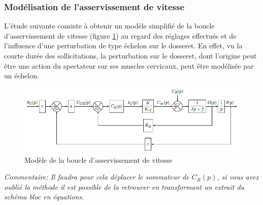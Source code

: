 \subsubsection{Modélisation de l'asservissement de vitesse}

L'étude suivante consiste à obtenir un modèle simplifié de la boucle d'asservissement de vitesse (figure \ref{fig13}) au regard des réglages effectués et de l'influence d'une perturbation de type échelon sur le dosseret. En effet, vu la courte durée des sollicitations, la perturbation sur le dosseret, dont l'origine peut être une action du spectateur sur ses muscles cervicaux, peut être modélisée par un échelon.

\begin{figure}[!ht]
\begin{center}
 \includegraphics[width=0.9\linewidth]{img/img13}
\end{center}
\caption{Modèle de la boucle d'asservissement de vitesse}
\label{fig13}
\end{figure}




\textit{Commentaire: Il faudra pour cela déplacer le sommateur de $C_R(p)$, si vous avez oublié la méthode il est possible de la retrouver en transformant un extrait du schéma bloc en équations.}

